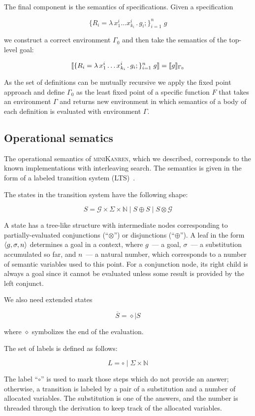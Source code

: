 The final component is the semantics of specifications. Given a specification

\[
\{R_i=\lambda\,x_1^i\dots x_{k_i}^i\,.\,g_i;\}_{i=1}^n\;g
\]

we construct a correct environment $\Gamma_0$ and then take the semantics of the top-level goal:

\[
\llbracket{\{R_i=\lambda\,x_1^i\dots x_{k_i}^i\,.\,g_i;\}_{i=1}^n\;g}\rrbracket=\llbracket{g}\rrbracket_{\Gamma_0}
\]

As the set of definitions can be mutually recursive we apply the fixed point approach and define $\Gamma_0$ as the least
fixed point of a specific function $F$ that takes an environment $\Gamma$ and returns new environment in which semantics
of a body of each definition is evaluated with environment $\Gamma$.


\subsection{Operational sematics}

The operational semantics of \textsc{miniKanren}, which we described, corresponds to the known
implementations with interleaving search. The semantics is given in the form of a labeled transition system (LTS)~\cite{LTS}.

The states in the transition system have the following shape:

\[
S = \mathcal{G}\times\Sigma\times\mathbb{N}\mid S\oplus S \mid S \otimes \mathcal{G}
\]

A state has a tree-like structure with intermediate nodes corresponding to partially-evaluated conjunctions (``$\otimes$'') or
disjunctions (``$\oplus$''). A leaf in the form $\left<{g, \sigma, n}\right>$ determines a goal in a context, where $g$~--- a goal, $\sigma$~--- a substitution accumulated so far,
and $n$~--- a natural number, which corresponds to a number of semantic variables used to this point. For a conjunction node, its right child is always a goal since
it cannot be evaluated unless some result is provided by the left conjunct.

We also need extended states

\[
\overline{S} = \diamond \mid S
\]

where $\diamond$ symbolizes the end of the evaluation.

The set of labels is defined as follows:

\[
L = \circ \mid \Sigma\times \mathbb{N}
\]

The label ``$\circ$'' is used to mark those steps which do not provide an answer; otherwise, a transition is labeled by a pair of a substitution and a number of allocated
variables. The substitution is one of the answers, and the number is threaded through the derivation to keep track of the allocated variables.

